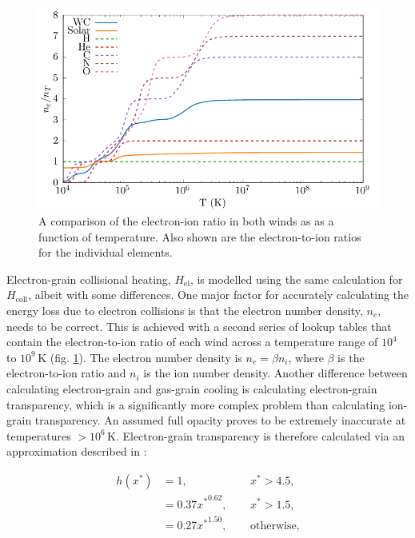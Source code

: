 \documentclass[fleqn,usenatbib]{mnras}
\begin{document}
\begin{figure}
  \centering
  \includegraphics[width=\linewidth]{assets/ionisation-fraction/ionisation-fraction.pdf}
  \caption[OB and WR electron-ion ratios]{A comparison of the electron-ion ratio in both winds as as a function of temperature. Also shown are the electron-to-ion ratios for the individual elements.}
  \label{fig:electron-curve}
\end{figure}

Electron-grain collisional heating, $H_\text{el}$, is modelled using the same calculation for $H_\text{coll}$, albeit with some differences.
One major factor for accurately calculating the energy loss due to electron collisions is that the electron number density, $n_e$, needs to be correct.
This is achieved with a second series of lookup tables that contain the electron-to-ion ratio of each wind across a temperature range of $10^4$ to $10^9\,\si{\kelvin}$ (fig. \ref{fig:electron-curve}).
The electron number density is $n_e = \beta n_i$, where $\beta$ is the electron-to-ion ratio and $n_i$ is the ion number density.
Another difference between calculating electron-grain and gas-grain cooling is calculating electron-grain transparency, which is a significantly more complex problem than calculating ion-grain transparency.
An assumed full opacity proves to be extremely inaccurate at temperatures $>10^6\,\si{\kelvin}$.
Electron-grain transparency is therefore calculated via an approximation described in \cite{dwek_infrared_1981}:

\begin{equation}
  \begin{alignedat}{3}
    h(x^*) & = 1 ,                && ~~ x^* > 4.5, \\
           & = 0.37{x^*}^{0.62} , && ~~ x^* > 1.5 , \\
           & = 0.27{x^*}^{1.50} , && ~~ \text{otherwise,}
  \end{alignedat}
\end{equation}
\end{document}
